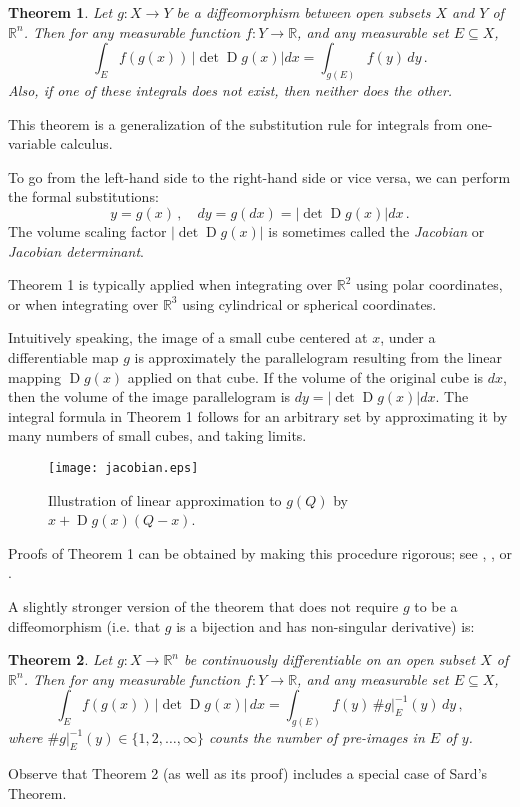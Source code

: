 \documentclass[12pt]{article}
\newtheorem{thm}{Theorem}
\newcommand{\real}{\mathbb{R}}
\newcommand{\abs}[1]{\lvert#1\rvert}
\DeclareMathOperator{\D}{D}
\begin{document}
\begin{thm}
Let $g\colon X \to Y$ be a diffeomorphism between 
open subsets $X$ and $Y$ of $\real^n$.
Then for any measurable function $f\colon Y \to \real$, and any measurable 
set $E \subseteq X$,
\[
 \int_E f(g(x)) \, \abs{\det \D g(x) } dx = \int_{g(E)} f(y) \, dy\,.
\]
Also, if one of these integrals does not exist, then neither does the other.
\end{thm}

This theorem is a generalization of the substitution rule 
for integrals from one-variable calculus.

To go from the left-hand side to the right-hand side or vice versa,
we can perform the formal substitutions:
\[
y = g(x) \,, \quad dy = g(dx) = \abs{ \det \D g(x) } dx\,.
\]
The volume scaling factor $\abs{\det \D g(x)}$ is sometimes called
the \emph{Jacobian} or \emph{Jacobian determinant}.

Theorem 1 is typically applied 
when integrating over $\real^2$ using polar coordinates,
or when integrating over $\real^3$ using cylindrical or spherical coordinates.

Intuitively speaking, the image of a small cube centered at $x$,
under a differentiable map $g$ is approximately
the parallelogram resulting from the linear mapping $\D g(x)$ 
applied on that cube. If the volume of the original cube is $dx$,
then the volume of the image parallelogram is $dy = \abs{\det \D g(x)} dx$.
The integral formula in Theorem 1 follows for an
arbitrary set by approximating it by many numbers of small cubes,
and taking limits.  

\begin{figure}
\begin{center}
\texttt{[image: jacobian.eps]}
\end{center}
\caption{Illustration of 
linear approximation to $g(Q)$ by $x + \D g(x) (Q-x)$.
{\small {}}
}
\end{figure}

Proofs of Theorem 1 can be obtained
by making this procedure rigorous;
see \cite{Schwartz}, \cite{Flett}, or \cite{Guzman}.

A slightly stronger version of the theorem that does not require 
$g$ to be a diffeomorphism
(i.e. that $g$ is a bijection and has non-singular derivative) is:

\begin{thm}
Let $g\colon X \to \real^n$ be continuously differentiable 
on an open subset $X$ of $\real^n$.
Then for any measurable function $f\colon Y \to \real$, and 
any measurable set $E \subseteq X$,
\[
 \int_E f(g(x)) \, \abs{\det \D g(x) } \, dx = 
 \int_{g(E)} f(y) \, \# g|_E^{-1}(y) \, dy\,,
\]
where $\# g|_E^{-1}(y) \in \{ 1, 2, \dotsc, \infty \}$
counts the number of pre-images in $E$ of $y$.
\end{thm}
Observe that Theorem 2 (as well as its proof) includes 
a special case of Sard's Theorem.
\end{document}
